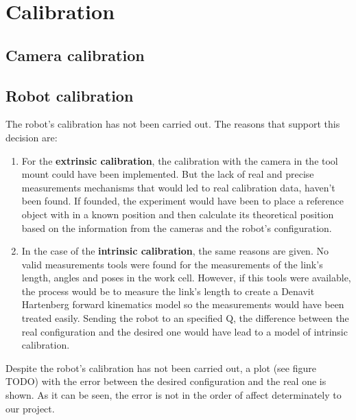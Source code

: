 \chapter{Calibration} %
\label{cha:calibration}

\section{Camera calibration} %
\label{sec:camera_calibration}


\section{Robot calibration} %
\label{sec:robot_calibration}
The robot's calibration has not been carried out. The reasons that support this decision are:
\begin{enumerate}
	\item For the \textbf{extrinsic calibration}, the calibration with the camera in the tool mount could have been implemented. But the lack of real and precise measurements mechanisms that would led to real calibration data, haven't been found. If founded, the experiment would have been to place a reference object with in a known position and then calculate its theoretical position based on the information from the cameras and the robot's configuration.
	\item In the case of the \textbf{intrinsic calibration}, the same reasons are given. No valid measurements tools were found for the measurements of the link's length, angles and poses in the work cell. However, if this tools were available, the process would be to measure the link's length to create a Denavit Hartenberg forward kinematics model so the measurements would have been treated easily. Sending the robot to an specified Q, the difference between the real configuration and the desired one would have lead to a model of intrinsic calibration.
\end{enumerate}

Despite the robot's calibration has not been carried out, a plot (see figure TODO) with the error between the desired configuration and the real one is shown. As it can be seen, the error is not in the order of affect determinately to our project.

